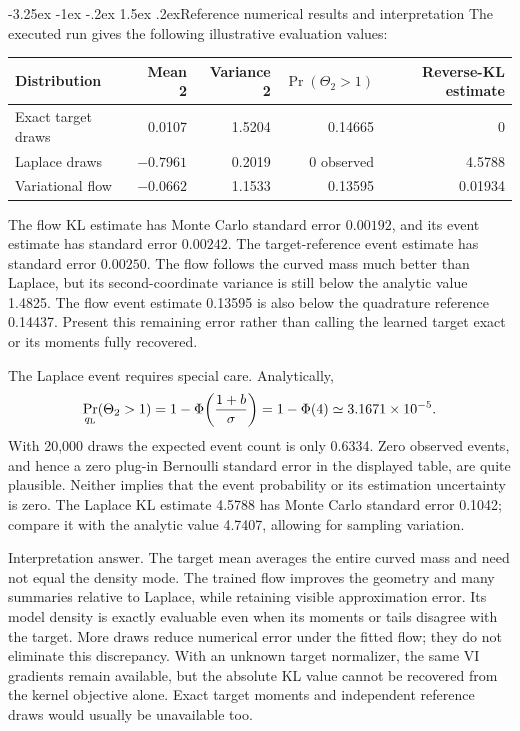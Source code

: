 \documentclass[11pt,a4paper]{article}
\makeatletter
\renewcommand\subsection{\@startsection{subsection}{2}{\z@}%
  {-3.25ex \@plus -1ex \@minus -.2ex}%
  {1.5ex \@plus .2ex}{\normalfont\large}}
\makeatother
\begin{document}
\subsection{Reference numerical results and interpretation}
The executed run gives the following illustrative evaluation values:
\begin{center}
\begin{tabular}{@{}lrrrr@{}}
\toprule
Distribution & Mean 2 & Variance 2 & $\Pr(\Theta_2>1)$ & Reverse-KL estimate \\
\midrule
Exact target draws & 0.0107 & 1.5204 & 0.14665 & 0 \\
Laplace draws & $-0.7961$ & 0.2019 & 0 observed & 4.5788 \\
Variational flow & $-0.0662$ & 1.1533 & 0.13595 & 0.01934 \\
\bottomrule
\end{tabular}
\end{center}
The flow KL estimate has Monte Carlo standard error $0.00192$, and its event
estimate has standard error $0.00242$. The target-reference event estimate
has standard error $0.00250$. The flow follows the curved mass much better
than Laplace, but its second-coordinate variance is still below the analytic
value 1.4825. The flow event estimate 0.13595 is also below the quadrature
reference 0.14437. Present this remaining error rather than calling the learned
target exact or its moments fully recovered.

The Laplace event requires special care. Analytically,
\[
 \Pr_{q_{\rm L}}(\Theta_2>1)
 =1-\Phi\!\left(\frac{1+b}{\sigma}\right)
 =1-\Phi(4)\simeq3.1671\times10^{-5}.
\]
With 20,000 draws the expected event count is only 0.6334. Zero observed
events, and hence a zero plug-in Bernoulli standard error in the displayed
table, are quite plausible. Neither implies that the event probability or
its estimation uncertainty is zero. The Laplace KL estimate 4.5788 has
Monte Carlo standard error 0.1042; compare it with the analytic value 4.7407,
allowing for sampling variation.

Interpretation answer. The target mean averages the entire curved
mass and need not equal the density mode. The trained flow improves the
geometry and many summaries relative to Laplace, while retaining visible
approximation error. Its model density is exactly evaluable even when its
moments or tails disagree with the target. More draws reduce numerical error
under the fitted flow; they do not eliminate this discrepancy. With an unknown
target normalizer, the same VI gradients remain available, but the absolute
KL value cannot be recovered from the kernel objective alone. Exact target
moments and independent reference draws would usually be unavailable too.
\end{document}
